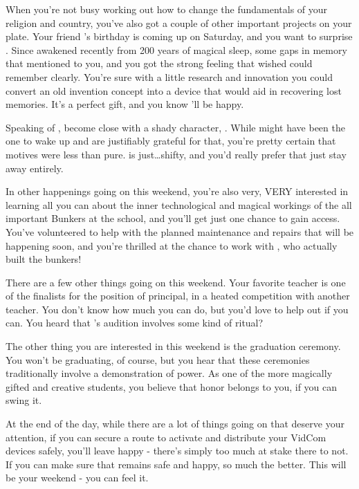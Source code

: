 \documentclass[char]{GL2020}
\begin{document}
When you’re not busy working out how to change the fundamentals of your religion and country, you’ve also got a couple of other important projects on your plate.  Your friend \cDisney{}’s birthday is coming up on Saturday, and you want to surprise \cDisney{\them}.  Since \cDisney{\them} \cDisney{\were} awakened recently from 200 years of magical sleep, \cDisney{\they} \cDisney{\have} some gaps in \cDisney{\their} memory that \cDisney{\they} mentioned to you, and you got the strong feeling that \cDisney{\they} wished \cDisney{\they} could remember clearly.  You’re sure with a little research and innovation you could convert an old invention concept into a device that would aid in recovering lost memories.  It’s a perfect gift, and you know \cDisney{\they}’ll be happy.

Speaking of \cDisney{}, \cDisney{\they} \cDisney{\have} become close with a shady character, \cWildCard{}. While \cWildCard{} might have been the one to wake \cDisney{} up and \cDisney{\they} are justifiably grateful for that, you’re pretty certain that \cWildCard{\their} motives were less than pure. \cWildCard{} is just\ldots shifty, and you’d really prefer that \cDisney{} just stay away entirely.

In other happenings going on this weekend, you’re also very, VERY interested in learning all you can about the inner technological and magical workings of the all important Bunkers at the school, and you’ll get just one chance to gain access. You’ve volunteered to help with the planned maintenance and repairs that will be happening soon, and you’re thrilled at the chance to work with \cBunker{}, who actually built the bunkers!

There are a few other things going on this weekend. Your favorite teacher \cBeetle{} is one of the finalists for the position of principal, in a heated competition with another teacher. You don’t know how much you can do, but you’d love to help \cBeetle{\them} out if you can. You heard that \cBeetle{}’s audition involves some kind of ritual?

The other thing you are interested in this weekend is the graduation ceremony. You won’t be graduating, of course, but you hear that these ceremonies traditionally involve a demonstration of power. As one of the more magically gifted and creative students, you believe that honor belongs to you, if you can swing it.

At the end of the day, while there are a lot of things going on that deserve your attention, if you can secure a route to activate and distribute your VidCom devices safely, you’ll leave happy - there’s simply too much at stake there to not. If you can make sure that \cDisney{} remains safe and happy, so much the better. This will be your weekend - you can feel it.
\end{document}
